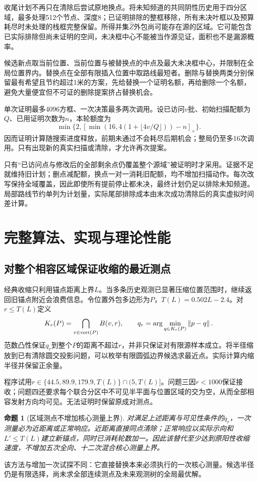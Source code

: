\documentclass[UTF8,a4paper,zihao=-4,fontset=windows]{ctexart}
\newtheorem{proposition}[theorem]{命题}
\newcommand{\norm}[1]{\left\lVert#1\right\rVert}
\begin{document}
收尾计划不再只在清除后尝试原地换点。将未知频道的共同阴性历史用于四分区域，最多处理512个节点、深度8；已证明排除的整框移除，所有未决叶框以及预算耗尽时未处理的栈框完整保留。所得并集$\widehat Z$外包尚可能存在源的区域。它可能包含已实际排除但尚未证明的空间，未决框中心不能被当作源见证，面积也不是漏源概率。

候选新点取当前位置、当前位置与被替换点的中点及最大未决框中心，并限制在全局位置界内。替换点在全部有限插入位置中取路线最短者。删除与替换两类分别保留最有希望且节约超过1米的方案，先给替换一个证明名额，再给删除一个名额，避免大量便宜但不可证的删除提案挤占替换机会。

单次证明最多4096方框、一次决策最多两次调用。设已访问$v$批、初始扫描配额为$Q$、已用证明次数为$n$，本轮额度为
\[
\min\{2,[\min(16,4(1+\lfloor4v/Q\rfloor))-n]_+\}.
\]
因而证明计算随搜索进度释放，前期未通过不会耗尽后期机会；整局仍至多16次调用。只有出现新的真实扫描或清除，才允许再次提案。

只有“已访问点与修改后的全部剩余点仍覆盖整个源域”被证明时才采用。证据不足就维持旧计划；删点减配额，换点一对一消耗旧配额，均不增加扫描动作。每次改写保持全域覆盖，因此即使所有提前停止都未决，最终计划仍足以排除未知频道。局部路线节约单列为计划量，实际尾部排除成本由末次成功清除后的真实虚拟时间差计算。

\section{完整算法、实现与理论性能}

\subsection{对整个相容区域保证收缩的最近测点}
经典收缩只利用锚点距离上界$L$。当多条历史观测已显著压缩位置范围时，继续返回旧锚点附近会浪费信息。令位置外包多边形为$P$，$T(L)=0.502L-2.4$。对$r\le T(L)$定义
\begin{equation}\label{eq:regionalprobe}
K_r(P)=\bigcap_{v\in{\rm vert}(P)}B(v,r),\qquad
q_r=\arg\min_{q\in K_r(P)}\norm{p-q}.
\end{equation}
范数凸性保证$q_r$到整个$P$的距离不超过$r$，并非只保证对有限源样本成立。将半径缩放到已有清除圆交投影问题，可以枚举有限圆弧边界候选求最近点。实际计算内缩半径并保留正余量。

程序试用$r\in\{44.5,89.9,179.9,T(L)\}\cap(5,T(L)]$。问题三因$r<1000$保证接收；问题四还要求每个联合分区中不可见半平面与位置区域的交为空，从而全部相容发射方向均可见。无法证明时保留原成对测点。

\begin{proposition}[区域测点不增加核心测量上界]
对满足上述距离与可见性条件的$q_r$，一次测量必为近距离或正常响应。近距离直接同点清除；正常响应以实际示向和$L'\le T(L)$建立新锚点，同时已消耗轮数加一。因此该替代至少达到原阳性收缩速度，不增加五次全向、十二次混合核心测量上界。
\end{proposition}
该方法与增加一次试探不同：它直接替换本来必须执行的一次核心测量。候选半径仍是有限选择，尚未求全部连续测点及未来观测树的全局最优解。
\end{document}
